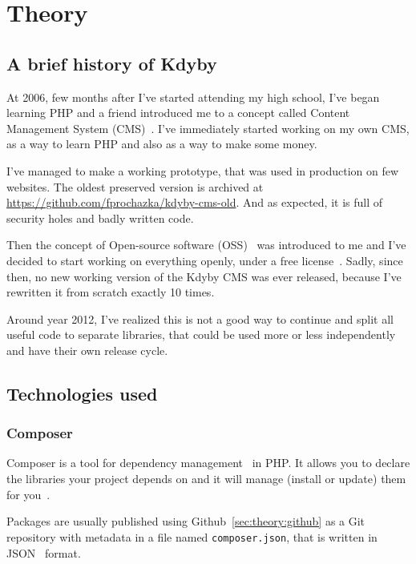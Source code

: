 \chapter{Theory}

\section{A brief history of Kdyby} \label{sec:theory:kdyby-history}

At 2006, few months after I've started attending my high school, I've began learning PHP and a friend introduced me to a concept called Content Management System (CMS)~\cite{wiki:cms}. I've immediately started working on my own CMS, as a way to learn PHP and also as a way to make some money.

I've managed to make a working prototype, that was used in production on few websites. The oldest preserved version is archived at \url{https://github.com/fprochazka/kdyby-cms-old}. And as expected, it is full of security holes and badly written code.

Then the concept of Open-source software (OSS)~\cite{wiki:oss} was introduced to me and I've decided to start working on everything openly, under a free license~\cite{wiki:fsl}. Sadly, since then, no new working version of the Kdyby CMS was ever released, because I've rewritten it from scratch exactly 10 times.

Around year 2012, I've realized this is not a good way to continue and split all useful code to separate libraries, that could be used more or less independently and have their own release cycle.

\section{Technologies used}

\subsection{Composer} \label{sec:theory:composer}

Composer is a tool for dependency management~\cite{wiki:package-manager} in PHP. It allows you to declare the libraries your project depends on and it will manage (install or update) them for you~\cite{composer:docs:intro}.

Packages are usually published using Github~\ref{sec:theory:github} as a Git~\cite{wiki:git} repository with metadata in a file named \lstinline{composer.json}, that is written in JSON~\cite{wiki:json} format.

